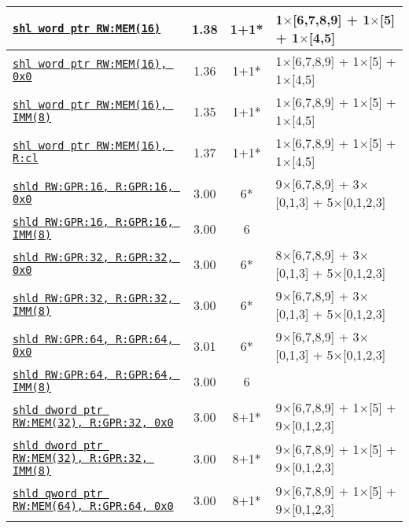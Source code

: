 \documentclass[a4paper,english,fontsize=9]{scrartcl}
\begin{document}
\begin{longtable}{p{}ccL{.25\textwidth}}
  \midrule
  \texttt{\href{https://felixcloutier.com/x86/SAL:SAR:SHL:SHR.html}{shl word ptr RW:MEM(16)}} & 1.38 & 1+1* & 1\(\times\)[6,7,8,9] + 1\(\times\)[5] + 1\(\times\)[4,5] \\
  \midrule
  \texttt{\href{https://felixcloutier.com/x86/SAL:SAR:SHL:SHR.html}{shl word ptr RW:MEM(16), 0x0}} & 1.36 & 1+1* & 1\(\times\)[6,7,8,9] + 1\(\times\)[5] + 1\(\times\)[4,5] \\
  \midrule
  \texttt{\href{https://felixcloutier.com/x86/SAL:SAR:SHL:SHR.html}{shl word ptr RW:MEM(16), IMM(8)}} & 1.35 & 1+1* & 1\(\times\)[6,7,8,9] + 1\(\times\)[5] + 1\(\times\)[4,5] \\
  \midrule
  \texttt{\href{https://felixcloutier.com/x86/SAL:SAR:SHL:SHR.html}{shl word ptr RW:MEM(16), R:cl}} & 1.37 & 1+1* & 1\(\times\)[6,7,8,9] + 1\(\times\)[5] + 1\(\times\)[4,5] \\
  \midrule
  \texttt{\href{https://felixcloutier.com/x86/SHLD.html}{shld RW:GPR:16, R:GPR:16, 0x0}} & 3.00 & 6* & 9\(\times\)[6,7,8,9] + 3\(\times\)[0,1,3] + 5\(\times\)[0,1,2,3] \\
  \midrule
  \texttt{\href{https://felixcloutier.com/x86/SHLD.html}{shld RW:GPR:16, R:GPR:16, IMM(8)}} & 3.00 & 6 &  \\
  \midrule
  \texttt{\href{https://felixcloutier.com/x86/SHLD.html}{shld RW:GPR:32, R:GPR:32, 0x0}} & 3.00 & 6* & 8\(\times\)[6,7,8,9] + 3\(\times\)[0,1,3] + 5\(\times\)[0,1,2,3] \\
  \midrule
  \texttt{\href{https://felixcloutier.com/x86/SHLD.html}{shld RW:GPR:32, R:GPR:32, IMM(8)}} & 3.00 & 6* & 9\(\times\)[6,7,8,9] + 3\(\times\)[0,1,3] + 5\(\times\)[0,1,2,3] \\
  \midrule
  \texttt{\href{https://felixcloutier.com/x86/SHLD.html}{shld RW:GPR:64, R:GPR:64, 0x0}} & 3.01 & 6* & 9\(\times\)[6,7,8,9] + 3\(\times\)[0,1,3] + 5\(\times\)[0,1,2,3] \\
  \midrule
  \texttt{\href{https://felixcloutier.com/x86/SHLD.html}{shld RW:GPR:64, R:GPR:64, IMM(8)}} & 3.00 & 6 &  \\
  \midrule
  \texttt{\href{https://felixcloutier.com/x86/SHLD.html}{shld dword ptr RW:MEM(32), R:GPR:32, 0x0}} & 3.00 & 8+1* & 9\(\times\)[6,7,8,9] + 1\(\times\)[5] + 9\(\times\)[0,1,2,3] \\
  \midrule
  \texttt{\href{https://felixcloutier.com/x86/SHLD.html}{shld dword ptr RW:MEM(32), R:GPR:32, IMM(8)}} & 3.00 & 8+1* & 9\(\times\)[6,7,8,9] + 1\(\times\)[5] + 9\(\times\)[0,1,2,3] \\
  \midrule
  \texttt{\href{https://felixcloutier.com/x86/SHLD.html}{shld qword ptr RW:MEM(64), R:GPR:64, 0x0}} & 3.00 & 8+1* & 9\(\times\)[6,7,8,9] + 1\(\times\)[5] + 9\(\times\)[0,1,2,3] \\

\end{longtable}
\end{document}
